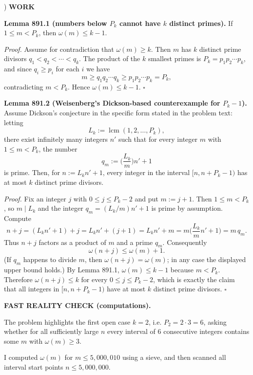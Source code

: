 ) \textbf{WORK}

\noindent \textbf{Lemma 891.1 (numbers below $P_k$ cannot have $k$ distinct primes).}
If $1\le m < P_k$, then $\omega(m)\le k-1$.

\noindent \emph{Proof.}
Assume for contradiction that $\omega(m)\ge k$. Then $m$ has $k$ distinct prime divisors $q_1<q_2<\cdots<q_k$. The product of the $k$ smallest primes is $P_k=p_1p_2\cdots p_k$, and since $q_i\ge p_i$ for each $i$ we have
\[
 m \ge q_1q_2\cdots q_k \ge p_1p_2\cdots p_k = P_k,
\]
contradicting $m<P_k$. Hence $\omega(m)\le k-1$.
\hfill$\square$

\medskip
\noindent \textbf{Lemma 891.2 (Weisenberg's Dickson-based counterexample for $P_k-1$).}
Assume Dickson's conjecture in the specific form stated in the problem text: letting
\[
L_k := \operatorname{lcm}(1,2,\dots,P_k),
\]
there exist infinitely many integers $n'$ such that for every integer $m$ with $1\le m<P_k$, the number
\[
q_m := \Big(\frac{L_k}{m}\Big) n' + 1
\]
is prime. Then, for $n:=L_k n' + 1$, every integer in the interval $[n,n+P_k-1)$ has at most $k$ distinct prime divisors.

\noindent \emph{Proof.}
Fix an integer $j$ with $0\le j\le P_k-2$ and put $m:=j+1$. Then $1\le m < P_k$, so $m\mid L_k$ and the integer $q_m=(L_k/m)n'+1$ is prime by assumption. Compute
\[
 n+j = (L_k n' + 1) + j = L_k n' + (j+1) = L_k n' + m = m\Big(\frac{L_k}{m}n' + 1\Big) = m\,q_m.
\]
Thus $n+j$ factors as a product of $m$ and a prime $q_m$. Consequently
\[
 \omega(n+j) \le \omega(m) + 1.
\]
(If $q_m$ happens to divide $m$, then $\omega(n+j)=\omega(m)$; in any case the displayed upper bound holds.)
By Lemma 891.1, $\omega(m)\le k-1$ because $m<P_k$. Therefore $\omega(n+j)\le k$ for every $0\le j\le P_k-2$, which is exactly the claim that all integers in $[n,n+P_k-1)$ have at most $k$ distinct prime divisors.
\hfill$\square$

\medskip
\noindent \textbf{FAST REALITY CHECK (computations).}

\noindent The problem highlights the first open case $k=2$, i.e. $P_2=2\cdot 3=6$, asking whether for all sufficiently large $n$ every interval of $6$ consecutive integers contains some $m$ with $\omega(m)\ge 3$.

\noindent I computed $\omega(m)$ for $m\le 5{,}000{,}010$ using a sieve, and then scanned all interval start points $n\le 5{,}000{,}000$.

